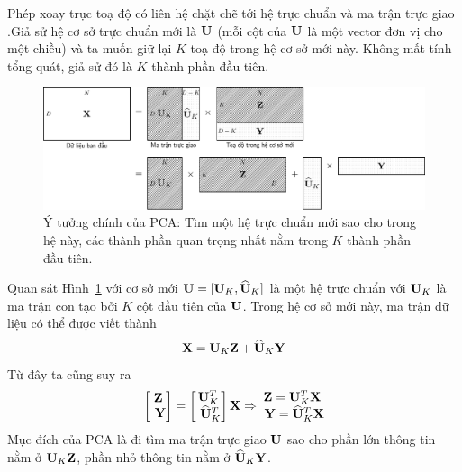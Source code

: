 Phép xoay trục toạ độ có liên hệ chặt chẽ tới hệ trực chuẩn và ma trận trực giao
.Giả sử hệ cơ sở trực chuẩn mới là $\mathbf{U}$ (mỗi cột của $\mathbf{U}$ là một vector đơn vị cho
một chiều) và ta muốn giữ lại $K$ toạ độ trong hệ
cơ sở mới này. Không mất tính tổng quát, giả sử đó là $K$ thành phần đầu tiên.
\begin{figure}[t]
    \centering
    \includegraphics[width = \textwidth]{Chapters/07_DimemsionalityReduction/27_pca/latex/pca_idea.pdf}
    \caption[]{Ý tưởng chính của PCA: Tìm một hệ trực chuẩn mới sao cho trong hệ này, các thành phần quan trọng nhất nằm trong $K$ thành phần đầu tiên.}
    \label{fig:27_3}
\end{figure}
Quan sát Hình~\ref{fig:27_3} với cơ sở mới $\mathbf{U} =
    [\mathbf{U}_K, \widehat{\mathbf{U}}_K]$ là một hệ trực chuẩn với $\mathbf{U}_K$ là ma trận con tạo bởi $K$ cột đầu tiên của $\mathbf{U}$. Trong hệ cơ sở mới này, ma trận dữ liệu có thể được viết thành
\begin{equation}
    \label{eqn:27_8}
    \mathbf{X} = \mathbf{U}_K \mathbf{Z} + \widehat{\mathbf{U}}_K \mathbf{Y}
\end{equation}
Từ đây ta cũng suy ra
\begin{eqnarray}
    \label{eqn:27_9}
    \left[\begin{matrix} \mathbf{Z} \\\ \mathbf{Y} \end{matrix} \right] =
    \left[\begin{matrix} \mathbf{U}_K^T \\\ \widehat{\mathbf{U}}_K^T \end{matrix} \right]\mathbf{X} \Rightarrow
    \begin{matrix}
        \mathbf{Z} = \mathbf{U}_K^T \mathbf{X} \\\
        \mathbf{Y} = \widehat{\mathbf{U}}_K^T\mathbf{X}
    \end{matrix}
\end{eqnarray}
Mục đích của PCA là đi tìm ma trận trực giao $\mathbf{U}$ sao cho phần lớn thông tin
nằm ở $\mathbf{U}_K \mathbf{Z}$, phần nhỏ thông tin nằm ở $\widehat{\mathbf{U}}_K\mathbf{Y}$.
